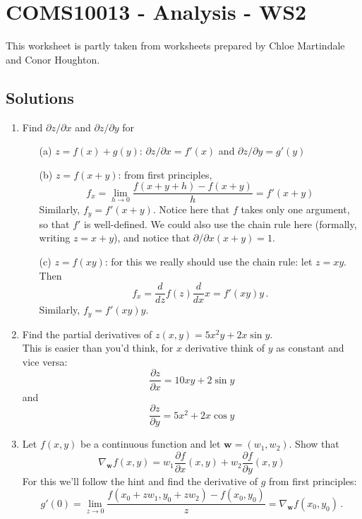 \documentclass[11pt,a4paper]{scrartcl}
\begin{document}
\section*{COMS10013 - Analysis - WS2}
This worksheet is partly taken from worksheets prepared by Chloe Martindale and Conor Houghton.

\subsection*{Solutions}

\begin{enumerate}

\item Find $\partial z/\partial x$ and $\partial z/\partial y$ for 
\begin{enumerate}
    \item[(a)] $z = f(x) +g(y)$: $\partial z/\partial x = f'(x)$ and $\partial z/\partial y=g'(y)$
    
    \item[(b)] $z = f(x+y)$: from first principles, 
    \[
    f_x = \lim_{h\to 0} \frac{f(x+y+h) - f(x+y)}{h} = f'(x+y)
    \]
    Similarly, $f_y = f'(x+y)$. Notice here that $f$ takes only one argument, so that $f'$ is well-defined. We could also use the chain rule here (formally, writing $z= x+y$), and notice that $\partial/\partial x (x+y) = 1$.
    \item[(c)] $z = f(xy)$: for this we really should use the chain rule: let $z = xy$. Then 
    \[
        f_x =  \frac{d}{dz}f(z) \frac{d}{dx}x = f'(xy)y\,.
    \]
    Similarly, $f_y = f'(xy)y$.
\end{enumerate}

\item Find the partial derivatives of $z(x,y)=5x^2y+2x\sin{y}$.\\
This is easier than you'd think, for $x$ derivative think of $y$ as constant and vice versa:
  \begin{equation}
    \frac{\partial z}{\partial x}=10xy+2\sin{y}
  \end{equation}
  and
  \begin{equation}
    \frac{\partial z}{\partial y}=5x^2+2x\cos{y}
  \end{equation}

\item Let $f(x,y)$ be a continuous function and let $\mathbf{w} = (w_1,w_2)$. 
Show that 
\[
\nabla_\mathbf{w} f(x,y)= w_1 \frac{\partial f}{\partial x}(x,y) + w_2 \frac{\partial f}{\partial y}(x,y)
\]
For this we'll follow the hint and find the derivative of $g$ from first principles:
\[
g'(0) = \lim_{z\to 0} \frac{f(x_0 + zw_1, y_0 + zw_2)- f(x_0 , y_0)}{z} = \nabla_{\mathbf{w}}f(x_0,y_0)\,.
\]


\end{enumerate}
\end{document}
